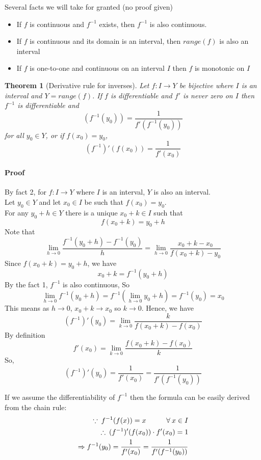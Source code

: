 \documentclass[12pt]{article}
\newcommand\tab[1][1cm]{\hspace*{#1}}
\newtheorem{theorem}{Theorem}
\begin{document}
Several facts we will take for granted (no proof given)
\begin{itemize} 
     \item If $f$ is continuous and $f^{-1}$ exists, then $f^{-1}$ is also continuous.
     \item If $f$ is continuous and its domain is an interval, then $range(f)$ is also an interval
     \item If $f$ is one-to-one and continuous on an interval $I$ then $f$ is monotonic on $I$
\end{itemize}

\begin{theorem}[Derivative rule for inverses]
     Let $f : I \to Y$ be bijective where $I$ is an interval and $Y = range(f)$. If $f$ is differentiable and $f'$ is never zero on $I$
     then $f^{-1}$ is differentiable and
     \[
         (f^{-1}(y_0)) = \frac{1}{f'(f^{-1}(y_0))}
     \]
     for all $y_0 \in Y$, or if $f(x_0) = y_0$, 
     \[
         (f^{-1})'(f(x_0)) = \frac{1}{f'(x_0)}
     \]
\end{theorem}

\paragraph{Proof}
By fact 2, for $f : I \to Y$ where $I$ is an interval, $Y$ is also an interval. \\
Let $y_0 \in Y$ and let $x_0 \in I$ be such that $f(x_0) = y_0$. \\
For any $y_0 + h \in Y$ there is a unique $x_0 + k \in I$ such that
\[
    f(x_0 + k) = y_0 + h
\]
Note that
\[
    \lim_{h \to 0} \frac{f^{ - 1}(y_0 + h) - f^{-1}(y_0)}{h} = \lim_{h \to 0} \frac{x_0 + k - x_0}{f(x_0 + k) - y_0} 
\]
Since $f(x_0 + k) = y_0 + h$, we have
\[
    x_0 + k = f^{-1} (y_0 + h)
\]
By the fact 1, $f^{-1}$ is also continuous, So
\[
    \lim_{h \to 0} f^{-1}(y_0 + h) = f^{-1}(\lim_{h \to 0} y_0 + h) = f^{-1}(y_0) = x_0
\]
This means as $h \to 0$, $x_0 + k \to x_0$ so $k \to 0$. Hence, we have
\[
    (f^{-1})'(y_0) = \lim_{k \to 0} \frac{k}{f(x_0 + k) - f(x_0)}
\]
By definition
\[
    f'(x_0) = \lim_{k \to 0} \frac{f(x_0 + k) - f(x_0)}{k} 
\]
So,
\[
    (f^{-1})'(y_0) = \frac{1}{f'(x_0)} = \frac{1}{f'(f^{-1}(y_0))}
\]

If we assume the differentiability of $f^{-1}$ then the formula can be easily derived from the chain rule:
\begin{align*} 
    \because \: f^{-1}(f(x)) = x \textrm{\tab} \forall \: x \in I \\
    \therefore \: (f^{-1})'(f(x_0)) \cdot f'(x_0) = 1 \\
    \Rightarrow f^{-1}(y_0) = \frac{1}{f'(x_0)} = \frac{1}{f'(f^{-1}(y_0))}
\end{align*}
\end{document}

